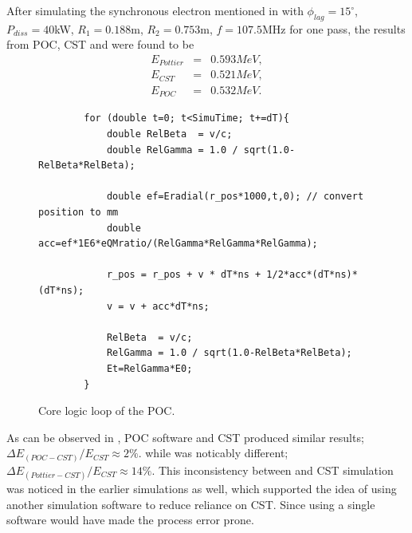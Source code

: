 \documentclass[a4paper,oneside,12pt]{report}
\numberwithin{equation}{chapter}
\begin{document}
After simulating the synchronous electron mentioned in  
with $\phi_{lag}=15^\circ$, $P_{diss}=40$kW, $R_1=0.188$m, $R_2=0.753$m, $f=107.5$MHz for one pass, 
the results from POC, CST and  were found to be
\vspace{-20pt}\begin{eqnarray}
    E_{Pottier} &=& 0.593 MeV  , \\
    E_{CST} &=& 0.521 MeV  ,  \label{eq:poc_E_results}\\
    E_{POC} &=& 0.532 MeV . 
\end{eqnarray}

\begin{figure}[H]
    \begin{verbatim}
        for (double t=0; t<SimuTime; t+=dT){
            double RelBeta  = v/c;
            double RelGamma = 1.0 / sqrt(1.0-RelBeta*RelBeta);
        
            double ef=Eradial(r_pos*1000,t,0); // convert position to mm
            double acc=ef*1E6*eQMratio/(RelGamma*RelGamma*RelGamma); 
        
            r_pos = r_pos + v * dT*ns + 1/2*acc*(dT*ns)*(dT*ns);
            v = v + acc*dT*ns;

            RelBeta  = v/c;
            RelGamma = 1.0 / sqrt(1.0-RelBeta*RelBeta);
            Et=RelGamma*E0; 
        }
    \end{verbatim}
    \vspace{-3pt}
    \caption{Core logic loop of the POC.}
    \label{fig:POC_core_logic}
\end{figure}


\vspace{-15pt}
As can be observed in , POC software and CST produced similar results; $\Delta E_{(POC-CST)}/E_{CST} \approx 2\%$.
while  was noticably different; $\Delta E_{(Pottier-CST)}/E_{CST} \approx 14\%$.
This inconsistency between  and  CST simulation was noticed in the earlier simulations as well, which supported the idea of using another simulation software to reduce reliance on CST.
Since using a single software would have made the process error prone.
\end{document}
